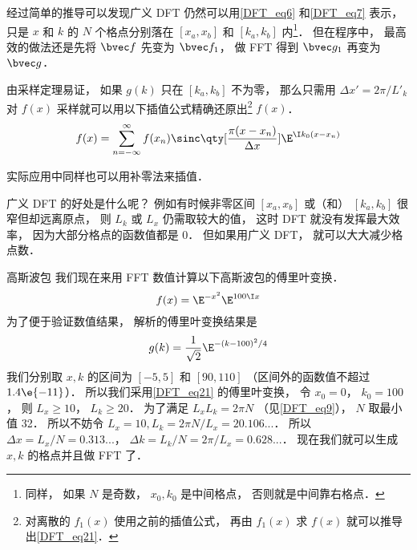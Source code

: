 经过简单的推导可以发现广义 DFT 仍然可以用\autoref{DFT_eq6} 和\autoref{DFT_eq7} 表示， 只是 $x$ 和 $k$ 的 $N$ 个格点分别落在 $[x_a, x_b]$ 和 $[k_a, k_b]$ 内\footnote{同样， 如果 $N$ 是奇数， $x_0, k_0$ 是中间格点， 否则就是中间靠右格点．}． 但在程序中， 最高效的做法还是先将 $\bvec f$ 先变为 $\bvec f_1$， 做 FFT 得到 $\bvec g_1$ 再变为 $\bvec g$．

由采样定理易证， 如果 $g(k)$ 只在 $[k_a, k_b]$ 不为零， 那么只需用 $\Delta x' = 2\pi/L'_k$ 对 $f(x)$ 采样就可以用以下插值公式精确还原出\footnote{对离散的 $f_1(x)$ 使用之前的插值公式， 再由 $f_1(x)$ 求 $f(x)$ 就可以推导出\autoref{DFT_eq21}．} $f(x)$．
\begin{equation}\label{DFT_eq21}
f(x) = \sum_{n = -\infty}^{\infty} f(x_n)\sinc\qty[\frac{\pi(x - x_n)}{\Delta x}] \E^{\I k_0 (x-x_n)}
\end{equation}

实际应用中同样也可以用补零法来插值．

广义 DFT 的好处是什么呢？ 例如有时候非零区间 $[x_a, x_b]$ 或（和） $[k_a, k_b]$ 很窄但却远离原点， 则 $L_k$ 或 $L_x$ 仍需取较大的值， 这时 DFT 就没有发挥最大效率， 因为大部分格点的函数值都是 0． 但如果用广义 DFT， 就可以大大减少格点数．

\begin{example}{高斯波包}
我们现在来用 FFT 数值计算以下高斯波包的傅里叶变换．
\begin{equation}
f(x) = \E^{-x^2}\E^{100 \I x}
\end{equation}
为了便于验证数值结果， 解析的傅里叶变换结果是%
\begin{equation}
g(k) = \frac{1}{\sqrt2}\E^{-(k-100)^2/4}
\end{equation}
我们分别取 $x, k$ 的区间为 $[-5, 5]$ 和 $[90, 110]$ （区间外的函数值不超过 $1.4\e{-11}$）． 所以我们采用\autoref{DFT_eq21} 的傅里叶变换， 令 $x_0 = 0$， $k_0 = 100$， 则 $L_x \geqslant 10$， $L_k \geqslant 20$． 为了满足 $L_x L_k = 2\pi N$ （见\autoref{DFT_eq9}）， $N$ 取最小值 32． 所以不妨令 $L_x = 10, L_k = 2\pi N/L_x = 20.106...$．
所以 $\Delta x = L_x/N = 0.313...$， $\Delta k = L_k/N = 2\pi/L_x = 0.628...$． 现在我们就可以生成 $x, k$ 的格点并且做 FFT 了．
\end{example}



